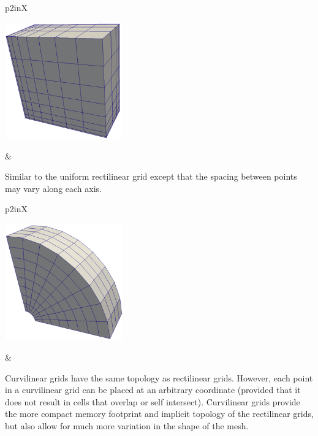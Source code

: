 \noindent
\begin{tabularx}{\linewidth}{p{2in}X}
  \parbox{2in}{\includegraphics[width=2in]{images/RectilinearGrid}} &
  \begin{minipage}{\linewidth}

    Similar to the uniform rectilinear grid except that the spacing between
    points may vary along each axis.
  \end{minipage}
\end{tabularx}

\noindent
\begin{tabularx}{\linewidth}{p{2in}X}
  \parbox{2in}{\includegraphics[width=2in]{images/StructuredGrid}} &
  \begin{minipage}{\linewidth}

    Curvilinear grids have the same topology as rectilinear grids.
    However, each point in a curvilinear grid can be placed at an arbitrary
    coordinate (provided that it does not result in cells that overlap or
    self intersect).  Curvilinear grids provide the more compact memory
    footprint and implicit topology of the rectilinear grids, but also
    allow for much more variation in the shape of the mesh.
  \end{minipage}
\end{tabularx}

